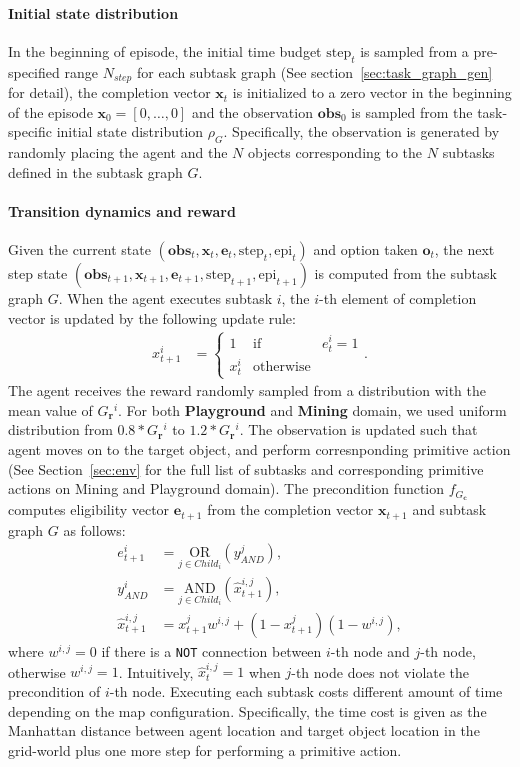 \documentclass{article} \usepackage{iclr2020_conference,times}
\newcommand{\GC}{ G_{\mb{c}} }
\newcommand{\GR}{ G_{\mb{r}} }
\newcommand{\mb}{\mathbf}
\newcommand{\tb}{\textbf}
\newcommand{\cutparagraphup}{\vspace{-2pt}}
\begin{document}
\paragraph{Initial state distribution} In the beginning of episode, the initial time budget $\text{step}_t$ is sampled from a pre-specified range $N_{step}$ for each subtask graph (See section~\ref{sec:task_graph_gen} for detail), the completion vector $\mb{x}_t$ is initialized to a zero vector in the beginning of the episode $\mb{x}_0=[0,\ldots,0]$ and the observation $\mb{obs}_0$ is sampled from the task-specific initial state distribution $\rho_{G}$. Specifically, the observation is generated by randomly placing the agent and the $N$ objects corresponding to the $N$ subtasks defined in the subtask graph $G$.
\cutparagraphup
\paragraph{Transition dynamics and reward} Given the current state $(\mb{obs}_t, \mb{x}_t, \mb{e}_t, \text{step}_{t}, \text{epi}_{t})$ and option taken $\mb{o}_t$, the next step state $(\mb{obs}_{t+1}, \mb{x}_{t+1}, \mb{e}_{t+1}, \text{step}_{t+1}, \text{epi}_{t+1})$ is computed from the subtask graph $G$. When the agent executes subtask $i$, the $i$-th element of completion vector is updated by the following update rule:
\begin{align}
    x^i_{t+1} &=\left\{ \begin{array}{rcl}
1 & \mbox{if} & e_t^i=1 \\ 
x^i_t & \mbox{otherwise} & 
\end{array}\right..
\end{align}
The agent receives the reward randomly sampled from a distribution with the mean value of $\GR{}^i$. For both \tb{Playground} and \tb{Mining} domain, we used uniform distribution from $0.8*\GR{}^i$ to $1.2*\GR{}^i$.
The observation is updated such that agent moves on to the target object, and perform corresnponding primitive action (See Section~\ref{sec:env} for the full list of subtasks and corresponding primitive actions on Mining and Playground domain). The precondition function $f_{\GC{}}$ computes eligibility vector $\mb{e}_{t+1}$ from the completion vector $\mb{x}_{t+1}$ and subtask graph $G$ as follows:
\begin{align}
  e_{t+1}^{i} &= \underset{j\in Child_i}{\text{OR}} \left( y^{j}_{AND}\right),\label{eq:or}\\
  y^{i}_{AND} &= \underset{j\in Child_i}{\text{AND}} \left( \hat{x}_{t+1}^{i,j}\right),\label{eq:and}\\
  \hat{x}_{t+1}^{i,j}&= x_{t+1}^jw^{i,j} + (1-x_{t+1}^j)(1-w^{i,j}),\label{eq:tp}
\end{align}
where $w^{i, j}=0$ if there is a \texttt{NOT} connection between $i$-th node and $j$-th node, otherwise $w^{i,j}=1$. Intuitively, $\hat{x}_{t}^{i,j}=1$ when $j$-th node does not violate the precondition of $i$-th node. Executing each subtask costs different amount of time depending on the map configuration. Specifically, the time cost is given as the Manhattan distance between agent location and target object location in the grid-world plus one more step for performing a primitive action. 
\fi
\end{document}
